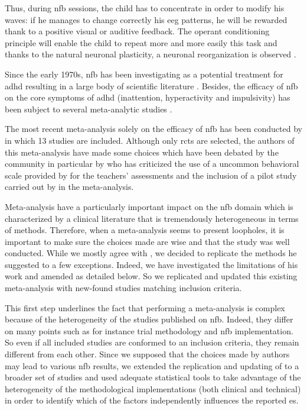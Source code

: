 Thus, during \gls{nfb} sessions, the child has to concentrate in order to modify his waves: 
if he manages to change correctly his \gls{eeg} patterns, he will be rewarded thank to 
a positive visual or auditive feedback. The operant conditioning principle will enable the 
child to repeat more and more easily this task and thanks to the natural neuronal plasticity,
 a neuronal reorganization is observed \citep{VanDoren2017}. 

Since the early 1970s, \gls{nfb} has been investigating as a potential treatment for \gls{adhd} resulting 
in a large body of scientific literature \citep{Lubar1976, Rossiter1995, Linden1996, Maurizio2014}.
Besides, the efficacy of \gls{nfb} on the core symptoms of \gls{adhd} (inattention, hyperactivity and 
impulsivity) has been subject to several meta-analytic studies \citep{Loo2005, Lofthouse2012, Arns2009, Micoulaud2014, 
Sonuga-Barke2013}.   

The most recent meta-analysis solely on the efficacy of \gls{nfb} has been conducted by \citet{Cortese2016} in 
which 13 studies are included. Although only \gls{rcts} are selected, the authors of 
this meta-analysis have made some choices which have been debated by the community in particular by 
\citet{Micoulaud2016} who has criticized the use of a uncommon behavioral scale provided by \citet{Steiner2014}
 for the teachers' assessments and the inclusion of a pilot study carried out by \citet{Arnold2014} in the meta-analysis. 

Meta-analysis have a particularly important impact on the \gls{nfb} domain which is 
characterized by a clinical literature that is tremendously heterogeneous in terms 
of methods. Therefore, when a meta-analysis seems to present loopholes, it is important to
 make sure the choices made are wise and that the study was well conducted. 
While we mostly agree with \citet{Cortese2016}, we decided to replicate the methods he suggested
 to a few exceptions. Indeed, we have investigated the limitations
 of his work and amended as detailed below. So we replicated and updated this existing meta-analysis 
with new-found studies matching \citet{Cortese2016} inclusion criteria.  

This first step underlines the fact that performing a meta-analysis is complex because of the heterogeneity 
of the studies published on \gls{nfb}. Indeed, they differ on many points such as for instance trial
 methodology and \gls{nfb} implementation. So even if all included studies are conformed to an 
inclusion criteria, they remain different from each other. Since we supposed 
that the choices made by authors may lead to various \gls{nfb} results, we extended the replication 
and updating of \citet{Cortese2016} to a broader set of studies and used 
adequate statistical tools to take advantage of the heterogeneity of the methodological implementations 
(both clinical and technical) in order to identify which of the factors 
independently influences the reported \gls{es}. 






